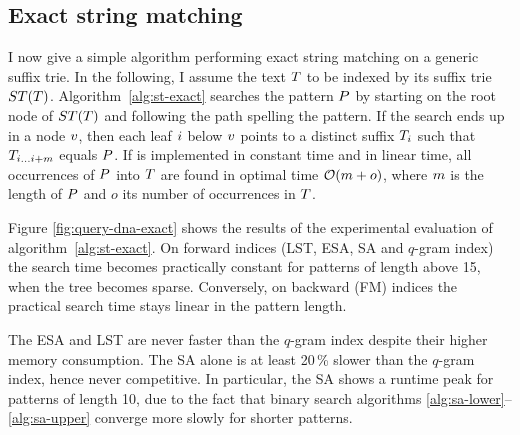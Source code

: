 \subsection{Exact string matching}
\label{sec:index:algo:exact}

I now give a simple algorithm performing exact string matching on a generic suffix trie.
In the following, I assume the text $T$ to be indexed by its suffix trie $ST(T)$.
Algorithm~\ref{alg:st-exact} searches the pattern $P$ by starting on the root node of $ST(T)$ and following the path spelling the pattern.
If the search ends up in a node $v$, then each leaf $i$ below $v$ points to a distinct suffix ${T}_{i}$ such that ${T}_{{i}\dots{i+m}}$ equals $P$.
If  is implemented in constant time and  in linear time, all occurrences of $P$ into $T$ are found in optimal time $\mathcal{O}(m+o)$, where $m$ is the length of $P$ and $o$ its number of occurrences in $T$.

Figure \ref{fig:query-dna-exact} shows the results of the experimental evaluation of algorithm~\ref{alg:st-exact}.
On forward indices (LST, ESA, SA and $q$-gram index) the search time becomes practically constant for patterns of length above 15, \ie when the tree becomes sparse.
Conversely, on backward (FM) indices the practical search time stays linear in the pattern length. 

The ESA and LST are never faster than the $q$-gram index despite their higher memory consumption.
The SA alone is at least 20\,\% slower than the $q$-gram index, hence never competitive.
In particular, the SA shows a runtime peak for patterns of length 10, due to the fact that binary search algorithms \ref{alg:sa-lower}--\ref{alg:sa-upper} converge more slowly for shorter patterns.

